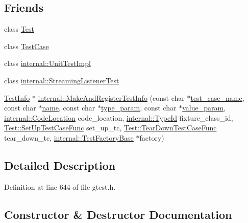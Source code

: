 \subsection*{Friends}
\begin{DoxyCompactItemize}
\item 
class \hyperlink{classtesting_1_1TestInfo_a5b78b1c2e1fa07ffed92da365593eaa4}{Test}
\item 
class \hyperlink{classtesting_1_1TestInfo_aff779e55b06adfa7c0088bd10253f0f0}{Test\+Case}
\item 
class \hyperlink{classtesting_1_1TestInfo_acc0a5e7573fd6ae7ad1878613bb86853}{internal\+::\+Unit\+Test\+Impl}
\item 
class \hyperlink{classtesting_1_1TestInfo_adc037d188dab349a94868991955c9cd4}{internal\+::\+Streaming\+Listener\+Test}
\item 
\hyperlink{classtesting_1_1TestInfo}{Test\+Info} $\ast$ \hyperlink{classtesting_1_1TestInfo_a70ddf8a12d8c05f17429f6381abc8ace}{internal\+::\+Make\+And\+Register\+Test\+Info} (const char $\ast$\hyperlink{classtesting_1_1TestInfo_a036a20710c8c2252889544daba9a8ff9}{test\+\_\+case\+\_\+name}, const char $\ast$\hyperlink{classtesting_1_1TestInfo_ac2581b45eccc9a3b94cb41c4807d0e34}{name}, const char $\ast$\hyperlink{classtesting_1_1TestInfo_a7759bc57f4350ad406cbbb0b3bcea320}{type\+\_\+param}, const char $\ast$\hyperlink{classtesting_1_1TestInfo_abdf2c6cfcf4819e725816c64e1c1fc24}{value\+\_\+param}, \hyperlink{structtesting_1_1internal_1_1CodeLocation}{internal\+::\+Code\+Location} code\+\_\+location, \hyperlink{namespacetesting_1_1internal_ab1114197d3c657d8b7f8e0c5caa12d00}{internal\+::\+Type\+Id} fixture\+\_\+class\+\_\+id, \hyperlink{classtesting_1_1Test_a5f2a051d1d99c9b784c666c586186cf9}{Test\+::\+Set\+Up\+Test\+Case\+Func} set\+\_\+up\+\_\+tc, \hyperlink{classtesting_1_1Test_aa0f532e93b9f3500144c53f31466976c}{Test\+::\+Tear\+Down\+Test\+Case\+Func} tear\+\_\+down\+\_\+tc, \hyperlink{classtesting_1_1internal_1_1TestFactoryBase}{internal\+::\+Test\+Factory\+Base} $\ast$factory)
\end{DoxyCompactItemize}


\subsection{Detailed Description}


Definition at line 644 of file gtest.\+h.



\subsection{Constructor \& Destructor Documentation}
\mbox{\label{classtesting_1_1TestInfo_a8d382c1b1b511f0d9112c14684809852}} 
